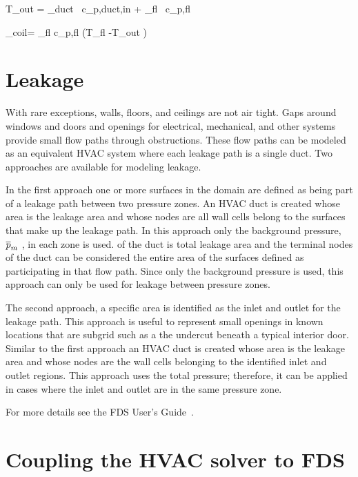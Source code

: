 \be T_{\rm out} = 
                             {_{\rm duct} \, c_{p,{\rm duct,in}} + _{\rm fl} \, c_{p,{\rm fl}} } \ee

\be {}_{\rm coil}= _{\rm fl} c_{p,{\rm fl}} \left(T_{\rm fl} -T_{\rm out} \right) \eta \ee

\section{Leakage}

With rare exceptions, walls, floors, and ceilings are not air tight.  Gaps around windows and doors and openings for electrical, mechanical, and other systems provide small flow paths through obstructions.  These flow paths can be modeled as an equivalent HVAC system where each leakage path is a single duct.  Two approaches are available for modeling leakage.

In the first approach one or more surfaces in the domain are defined as being part of a leakage path between two pressure zones. An HVAC duct is created whose area is the leakage area and whose nodes are all wall cells belong to the surfaces that make up the leakage path. In this approach only the background pressure, $\overline{p}_m$ , in each zone is used. of the duct is total leakage area and the terminal nodes of the duct can be considered the entire area of the surfaces defined as participating in that flow path. Since only the background pressure is used, this approach can only be used for leakage between pressure zones. 

The second approach, a specific area is identified as the inlet and outlet for the leakage path. This approach is useful to represent small openings in known locations that are subgrid such as a the undercut beneath a typical interior door. Similar to the first approach an HVAC duct is created whose area is the leakage area and whose nodes are the wall cells belonging to the identified inlet and outlet regions. This approach uses the total pressure; therefore, it can be applied in cases where the inlet and outlet are in the same pressure zone. 

For more details see the FDS User's Guide~\cite{FDS_Users_Guide}.

\newpage
\section{Coupling the HVAC solver to FDS}

